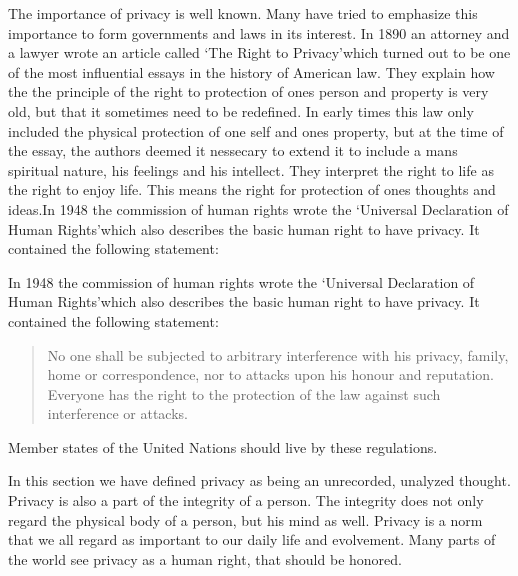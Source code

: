 The importance of privacy is well known. Many have tried to emphasize this importance to form governments and laws in its interest.
In 1890 an attorney and a lawyer wrote an article called  \lq The Right to Privacy\rq which turned out to be one of the most influential essays in the history of American law.\cite{website:the-right-to-privacy-info}
They explain how the the principle of the right to protection of ones person and property is very old, but that it sometimes need to be redefined. In early times this law only included the physical protection of one self and ones property, but at the time of the essay, the authors deemed it nessecary to extend it to include a mans spiritual nature, his feelings and his intellect. They interpret the right to life as the right to enjoy life. This means the right for protection of ones thoughts and ideas.In 1948 the commission of human rights wrote the \lq Universal Declaration of Human Rights\rq which also describes the basic human right to have privacy. It contained the following statement:

In 1948 the commission of human rights wrote the \lq Universal Declaration of Human Rights\rq which also describes the basic human right to have privacy. It contained the following statement:

\blockquote{No one shall be subjected to arbitrary interference with his privacy, family, home or correspondence, nor to attacks upon his honour and reputation. Everyone has the right to the protection of the law against such interference or attacks.\cite{website:un-human-rights}}

Member states of the United Nations should live by these regulations.


In this section we have defined privacy as being an unrecorded, unalyzed thought. Privacy is also a part of the integrity of a person. The integrity does not only regard the physical body of a person, but his mind as well.
Privacy is a norm that we all regard as important to our daily life and evolvement. Many parts of the world see privacy as a human right, that should be honored.

\newpage
